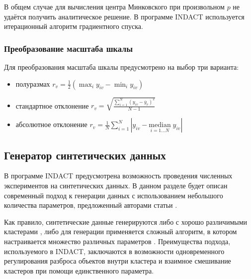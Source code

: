 \documentclass[12pt]{diploma}
\begin{document}
		В общем случае для вычисления центра Минковского при произвольном $ p $ не удаётся получить аналитическое решение. В программе INDACT используется итерационный алгоритм градиентного спуска.
	
		\subsubsection{Преобразование масштаба  шкалы}
		Для преобразования масштаба шкалы предусмотрено на выбор три варианта:
		\begin{itemize}
			\item полуразмах $\displaystyle r_v = \frac{1}{2}(\max_{i} y_{iv}- \min_{i}y_{iv}) $
			\item стандартное отклонение $ r_v = \sqrt{\frac{\sum_{i=1}^{N} (y_{iv}-\overline{y}_v)^2}{N-1}} $
			\item абсолютное отклонение $ r_v = \frac{1}{N}\sum_{i=1}^{N} | y_{iv} -  \underset{i=1\ldots N}{\mathrm{median}}\;y_{iv} | $
		\end{itemize}
	
	\subsection{Генератор синтетических данных} \label{subsec:generator}
	В программе INDACT предусмотрена возможность проведения численных экспериментов на синтетических данных. В данном разделе будет описан современный подход к генерации данных с использованием небольшого количества параметров, предложенный авторами статьи \cite{kovaleva}.
	
	Как правило, синтетические данные генерируются либо с хорошо различимыми кластерами \cite{data-gen1}, либо для генерации применяется сложный алгоритм, в котором настраивается множество различных параметров \cite{data-gen2}. Преимущества подхода, используемого в INDACT, заключаются в возможности одновременного регулирования разброса объектов внутри кластера и взаимное смешивание кластеров при помощи единственного параметра. 
	
\end{document}
